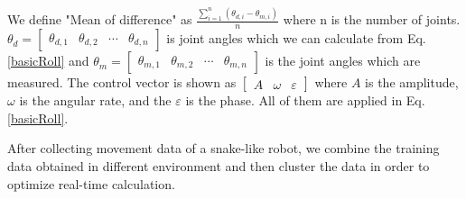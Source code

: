 We define "Mean of difference" as $\frac{\sum_{i=1}^{n}(\theta_{d,i}-\theta_{m,i})}{n} $ where n is the number of joints. $\theta_{d}=\begin{bmatrix}
\theta_{d,1} & \theta_{d,2} & \cdots & \theta_{d,n}
\end{bmatrix}$ is joint angles which we can calculate from Eq.\ref{basicRoll} and $\theta_{m}=\begin{bmatrix}
\theta_{m,1} & \theta_{m,2} & \cdots & \theta_{m,n}
\end{bmatrix}$ is the joint angles which are measured. The control vector is shown as
$\begin{bmatrix}
A& \omega&\varepsilon
\end{bmatrix}$
where $A$ is the amplitude, $\omega$ is the angular rate, and the $\varepsilon$ is the phase. All of them are applied in Eq.\ref{basicRoll}.

After collecting movement data of a snake-like robot, we combine the training data obtained in different environment and then cluster the data in order to optimize real-time calculation.

